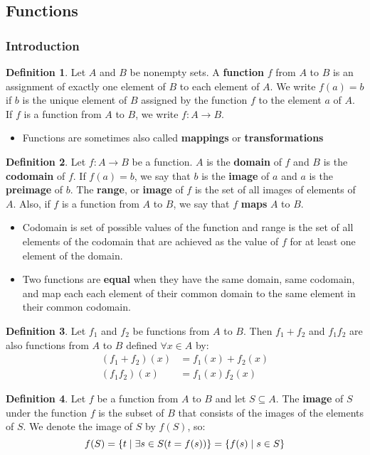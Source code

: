 \documentclass[article, 11pt]{article}
\theoremstyle{definition}
\newtheorem{definition}{Definition}[subsubsection]
\DeclarePairedDelimiter\set{\{}{\}}
\begin{document}
    \subsection{Functions}
    \subsubsection{Introduction}
    \begin{definition}
        Let $A$ and $B$ be nonempty sets. A \textbf{function} $f$ from $A$ to $B$ is an assignment of exactly one element of $B$ to each element of $A$. We write $f(a) = b$ if $b$ is the unique element of $B$ assigned by the function $f$ to the element $a$ of $A$. If $f$ is a function from $A$ to $B$, we write $f: A \to B$.
        \begin{itemize}
            \item Functions are sometimes also called \textbf{mappings} or \textbf{transformations}
        \end{itemize}
    \end{definition}
    \begin{definition}
        Let $f: A \to B$ be a function. $A$ is the \textbf{domain} of $f$ and $B$ is the \textbf{codomain} of $f$. If $f(a) = b$, we say that $b$ is the \textbf{image} of $a$ and $a$ is the \textbf{preimage} of $b$. The \textbf{range}, or \textbf{image} of $f$ is the set of all images of elements of $A$. Also, if $f$ is a function from $A$ to $B$, we say that $f$ \textbf{maps} $A$ to $B$.
        \begin{itemize}
            \item Codomain is set of possible values of the function and range is the set of all elements of the codomain that are achieved as the value of $f$ for at least one element of the domain.
            \item Two functions are \textbf{equal} when they have the same domain, same codomain, and map each each element of their common domain to the same element in their common codomain.
        \end{itemize}
    \end{definition}
    \begin{definition}
        Let $f_1$ and $f_2$ be functions from $A$ to $B$. Then $f_1 + f_2$ and $f_1f_2$ are also functions from $A$ to $B$ defined $\forall x \in A$ by:
        \begin{align*}
            (f_1 + f_2)(x) &= f_1(x) + f_2(x) \\
               (f_1f_2)(x) &= f_1(x)f_2(x)
        \end{align*}
    \end{definition}
    \begin{definition}
        Let $f$ be a function from $A$ to $B$ and let $S \subseteq A$. The \textbf{image} of $S$ under the function $f$ is the subset of $B$ that consists of the images of the elements of $S$. We denote the image of $S$ by $f(S)$, so:
        \begin{equation*}
            f(S) = \set*{t \mid \exists s \in S (t = f(s))} = \set*{f(s) \mid s \in S}
        \end{equation*}
    \end{definition}
\end{document}
